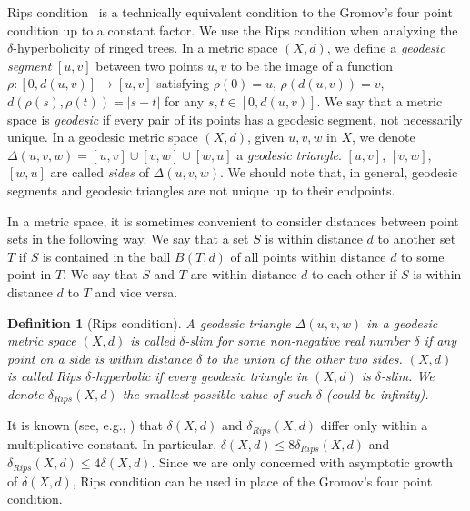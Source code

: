 \documentclass[11pt]{article}
\newtheorem{defi}{Definition}
\begin{document}
Rips condition~\cite{gromov1987hyperbolic,BH99} is a technically equivalent
	condition to the Gromov's four point condition up to a constant factor.
We use the Rips condition when analyzing
	the $\delta$-hyperbolicity of ringed trees.
In a metric space $(X,d)$, we define a \emph{geodesic segment} $[u,v]$ between two points $u,v$ to be the image of a function $\rho:[0,d(u,v)] \to [u,v]$ satisfying $\rho(0)=u$, $\rho(d(u,v))=v$, $d(\rho(s),\rho(t))=|s-t|$ for any $s,t \in [0,d(u,v)]$. We say that a metric space is \emph{geodesic} if every pair of its points has a geodesic segment, not necessarily unique.
In a geodesic metric space $(X,d)$, given $u,v,w$ in $X$, we denote $\Delta(u,v,w)=[u,v] \cup [v,w] \cup [w,u]$ a \emph{geodesic triangle}. $[u,v]$, $[v,w]$, $[w,u]$ are called \emph{sides} of $\Delta(u,v,w)$. We should note that, in general, geodesic segments and geodesic triangles are not unique up to their endpoints.

In a metric space, it is sometimes convenient to consider distances between point sets in the following way. We say that a set $S$ is within distance $d$ to another set $T$ if $S$ is contained in the ball $B(T,d)$ of all points within distance $d$ to some point in $T$. We say that $S$ and $T$ are within distance $d$ to each other if $S$ is within distance $d$ to $T$ and vice versa.




\begin{defi}[Rips condition]
A geodesic triangle $\Delta(u,v,w)$ in a geodesic metric space $(X,d)$
	is called \emph{$\delta$-slim} for some non-negative real number $\delta$
	if any point on a side is within 
	distance $\delta$ to the union of the other two sides. 
$(X,d)$ is called \emph{Rips $\delta$-hyperbolic} if every geodesic triangle 
	in $(X,d)$ is $\delta$-slim. 
We denote $\delta_{Rips}(X,d)$ the smallest possible value of such $\delta$
	(could be infinity).
\end{defi}

\noindent
It is known (see, e.g., \cite{ghys1990groupes,BH99,chepoi2008diameters}) that
	$\delta(X,d)$ and $\delta_{Rips}(X,d)$ differ only within a multiplicative 
	constant. 
In particular, $\delta(X,d) \le 8\delta_{Rips}(X,d)$ and
	$\delta_{Rips}(X,d) \le 4\delta(X,d)$.
Since we are only concerned with asymptotic growth of $\delta(X,d)$, 
	Rips condition can be used in place of the Gromov's 
	four point condition.
\end{document}
